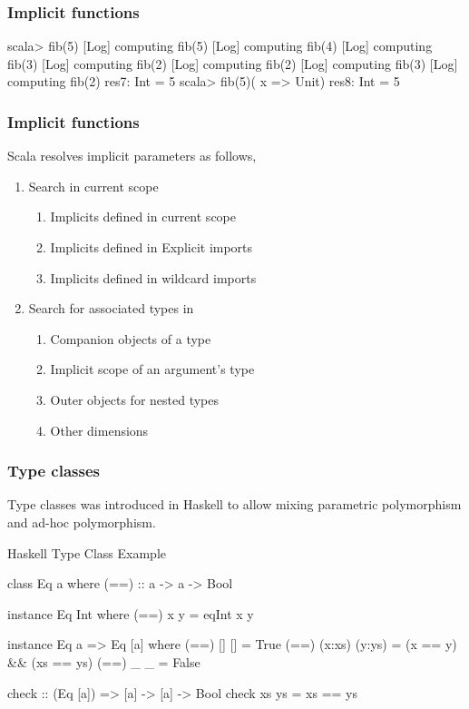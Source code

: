 \documentclass{beamer}
\newcommand{\beb}{\begin{exampleblock}}
\newcommand{\eeb}{\end{exampleblock}}
\begin{document}
\begin{frame}[fragile]
\frametitle{Implicit functions}

\begin{code}
scala> fib(5)
[Log] computing fib(5)
[Log] computing fib(4)
[Log] computing fib(3)
[Log] computing fib(2)
[Log] computing fib(2)
[Log] computing fib(3)
[Log] computing fib(2)
res7: Int = 5
scala> fib(5)( x => Unit) 
res8: Int = 5
\end{code}
\end{frame}
\begin{frame}[fragile]
\frametitle{Implicit functions}
Scala resolves implicit parameters as follows,
\begin{enumerate}
\item Search in current scope
  \begin{enumerate}
  \item Implicits defined in current scope
  \item Implicits defined in Explicit imports
  \item Implicits defined in wildcard imports
  \end{enumerate}
\item Search for associated types in
  \begin{enumerate}
  \item Companion objects of a type
  \item Implicit scope of an argument's type 
  \item Outer objects for nested types
  \item Other dimensions
  \end{enumerate}
\end{enumerate}
\end{frame}
\begin{frame}[fragile]
\frametitle{Type classes}

Type classes was introduced in Haskell to allow mixing parametric
polymorphism and ad-hoc polymorphism.
\beb{Haskell Type Class Example}
\begin{code}
class Eq a where 
  (==) :: a -> a -> Bool

instance Eq Int where
  (==) x y = eqInt x y

instance Eq a => Eq [a] where
  (==) [] [] = True
  (==) (x:xs) (y:ys) = (x == y) && (xs == ys)
  (==) _ _ = False

check :: (Eq [a]) => [a] -> [a] -> Bool
check xs ys = xs == ys
\end{code}
\eeb{}

\end{frame}
\end{document}
